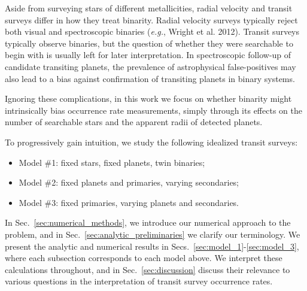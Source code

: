 Aside from surveying stars of different metallicities, radial velocity and 
transit surveys differ in how they treat binarity.
Radial velocity surveys typically reject both visual and spectroscopic binaries
({\it e.g.}, Wright et al. 2012).
Transit surveys typically observe binaries, but the question of whether they 
were searchable to begin with is usually left for later interpretation.
In spectroscopic follow-up of candidate transiting planets, the prevalence of 
astrophysical false-positives may also lead to a bias against confirmation of 
transiting planets in binary systems.

Ignoring these complications, in this work we focus on whether
binarity might intrinsically bias occurrence rate measurements, simply 
through its effects on the number of searchable stars and the apparent radii 
of detected planets.

To progressively gain intuition, we study the following idealized transit 
surveys:
\begin{itemize}
    \item Model \#1: fixed stars, fixed planets, twin binaries;
    \item Model \#2: fixed planets and primaries, varying secondaries;
    \item Model \#3: fixed primaries, varying planets and secondaries.
\end{itemize}
In Sec.~\ref{sec:numerical_methods}, we introduce our numerical approach 
to the problem, and in Sec.~\ref{sec:analytic_preliminaries} we clarify our 
terminology.
We present the analytic and numerical results in 
Secs.~\ref{sec:model_1}-\ref{sec:model_3}, where each subsection corresponds 
to each model above.
We interpret these calculations throughout, and in 
Sec.~\ref{sec:discussion} discuss their relevance to various questions in 
the interpretation of transit survey occurrence rates. 